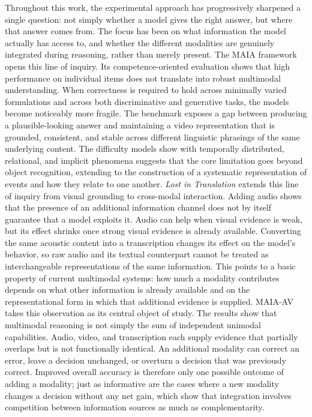 
Throughout this work, the experimental approach has progressively sharpened a single question: not simply whether a model gives the right answer, but where that answer comes from. The focus has been on what information the model actually has access to, and whether the different modalities are genuinely integrated during reasoning, rather than merely present.
The MAIA framework opens this line of inquiry. Its competence-oriented evaluation shows that high performance on individual items does not translate into robust multimodal understanding. When correctness is required to hold across minimally varied formulations and across both discriminative and generative tasks, the models become noticeably more fragile. The benchmark exposes a gap between producing a plausible-looking answer and maintaining a video representation that is grounded, consistent, and stable across different linguistic phrasings of the same underlying content. The difficulty models show with temporally distributed, relational, and implicit phenomena suggests that the core limitation goes beyond object recognition, extending to the construction of a systematic representation of events and how they relate to one another.
\textit{Lost in Translation} extends this line of inquiry from visual grounding to cross-modal interaction. Adding audio shows that the presence of an additional information channel does not by itself guarantee that a model exploits it. Audio can help when visual evidence is weak, but its effect shrinks once strong visual evidence is already available. Converting the same acoustic content into a transcription changes its effect on the model's behavior, so raw audio and its textual counterpart cannot be treated as interchangeable representations of the same information. This points to a basic property of current multimodal systems: how much a modality contributes depends on what other information is already available and on the representational form in which that additional evidence is supplied.
MAIA-AV takes this observation as its central object of study. The results show that multimodal reasoning is not simply the sum of independent unimodal capabilities. Audio, video, and transcription each supply evidence that partially overlaps but is not functionally identical. An additional modality can correct an error, leave a decision unchanged, or overturn a decision that was previously correct. Improved overall accuracy is therefore only one possible outcome of adding a modality; just as informative are the cases where a new modality changes a decision without any net gain, which show that integration involves competition between information sources as much as complementarity.
